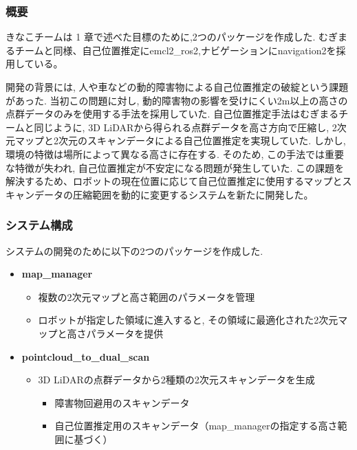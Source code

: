 \subsubsection{概要}
きなこチームは 1 章で述べた目標のために,2つのパッケージを作成した. 
むぎまるチームと同様、自己位置推定にemcl2\_ros2,ナビゲーションにnavigation2を採用している。

開発の背景には, 人や車などの動的障害物による自己位置推定の破綻という課題があった. 
当初この問題に対し, 動的障害物の影響を受けにくい2m以上の高さの点群データのみを使用する手法を採用していた. 
自己位置推定手法はむぎまるチームと同じように, 3D LiDARから得られる点群データを高さ方向で圧縮し, 2次元マップと2次元のスキャンデータによる自己位置推定を実現していた. 
しかし, 環境の特徴は場所によって異なる高さに存在する. 
そのため, この手法では重要な特徴が失われ, 自己位置推定が不安定になる問題が発生していた. 
この課題を解決するため、ロボットの現在位置に応じて自己位置推定に使用するマップとスキャンデータの圧縮範囲を動的に変更するシステムを新たに開発した。


\subsubsection{システム構成}
システムの開発のために以下の2つのパッケージを作成した. 

\begin{itemize}
  \item \textbf{map\_manager}
    \begin{itemize}
      \item 複数の2次元マップと高さ範囲のパラメータを管理
      \item ロボットが指定した領域に進入すると, その領域に最適化された2次元マップと高さパラメータを提供
    \end{itemize}
  \item \textbf{pointcloud\_to\_dual\_scan}
    \begin{itemize}
      \item 3D LiDARの点群データから2種類の2次元スキャンデータを生成
        \begin{itemize}
          \item 障害物回避用のスキャンデータ
          \item 自己位置推定用のスキャンデータ（map\_managerの指定する高さ範囲に基づく）
        \end{itemize}
    \end{itemize}
\end{itemize}

